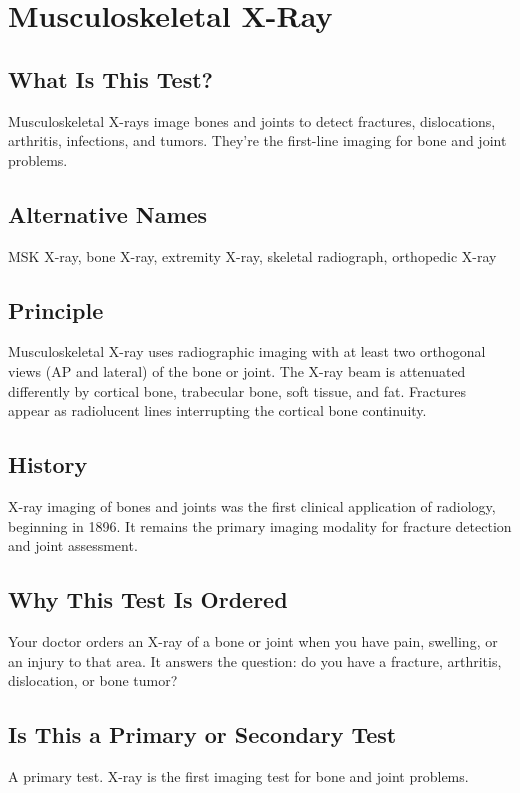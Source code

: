 \chapter{Musculoskeletal X-Ray}

\section*{What Is This Test?}
Musculoskeletal X-rays image bones and joints to detect fractures, dislocations, arthritis, infections, and tumors. They're the first-line imaging for bone and joint problems.

\section*{Alternative Names}
MSK X-ray, bone X-ray, extremity X-ray, skeletal radiograph, orthopedic X-ray


\section*{Principle}
Musculoskeletal X-ray uses radiographic imaging with at least two orthogonal views (AP and lateral) of the bone or joint. The X-ray beam is attenuated differently by cortical bone, trabecular bone, soft tissue, and fat. Fractures appear as radiolucent lines interrupting the cortical bone continuity.

\section*{History}
X-ray imaging of bones and joints was the first clinical application of radiology, beginning in 1896. It remains the primary imaging modality for fracture detection and joint assessment.

\section*{Why This Test Is Ordered}
Your doctor orders an X-ray of a bone or joint when you have pain, swelling, or an injury to that area. It answers the question: do you have a fracture, arthritis, dislocation, or bone tumor?

\section*{Is This a Primary or Secondary Test}
A primary test. X-ray is the first imaging test for bone and joint problems.


